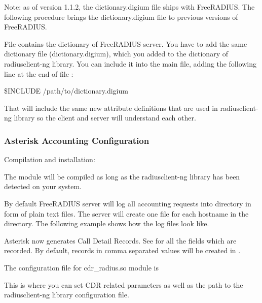 	Note: as of version 1.1.2, the dictionary.digium file ships with FreeRADIUS. 
	The following procedure brings the dictionary.digium file to previous versions 
	of FreeRADIUS.
	
	File  contains the dictionary of 
	FreeRADIUS server. You have to add the same dictionary file 
	(dictionary.digium), which you added to the dictionary of radiusclient-ng
	library. You can include it into the main file, adding the following line at the
	end of file :
		
	\$INCLUDE /path/to/dictionary.digium

	That will include the same new attribute definitions that are used 
	in radiusclient-ng library so the client and server will understand each 
	other. 


\subsubsection{Asterisk Accounting Configuration}

	Compilation and installation:

        The module will be compiled as long as the radiusclient-ng
        library has been detected on your system.
	
	By default FreeRADIUS server will log all accounting requests into 
	 directory in form of plain text files. 
	The server will create one file for each hostname in the directory. The 
	following example shows how the log files look like. 

	Asterisk now generates Call Detail Records. See 
	for all the fields which are recorded. By default, records in comma 
	separated values will be created in . 

	The configuration file for cdr\_radius.so module is 
	 
	This is where you can set CDR related parameters as well as the path to
	the radiusclient-ng library configuration file.



